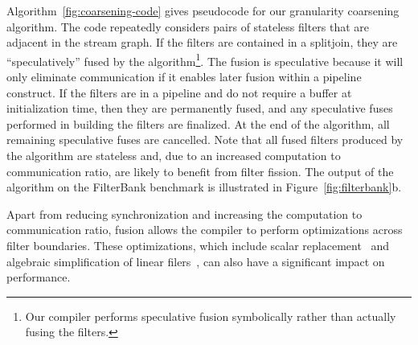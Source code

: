 Algorithm~\ref{fig:coarsening-code} gives pseudocode for our
granularity coarsening algorithm.  The code repeatedly considers pairs
of stateless filters that are adjacent in the stream graph.  If the
filters are contained in a splitjoin, they are ``speculatively'' fused
by the algorithm\footnote{Our compiler performs speculative fusion
symbolically rather than actually fusing the filters.}.  The fusion is
speculative because it will only eliminate communication if it enables
later fusion within a pipeline construct.  If the filters are in a
pipeline and do not require a buffer at initialization time, then they
are permanently fused, and any speculative fuses performed in building
the filters are finalized.  At the end of the algorithm, all remaining
speculative fuses are cancelled.  Note that all fused filters produced
by the algorithm are stateless and, due to an increased computation to
communication ratio, are likely to benefit from filter fission.  The
output of the algorithm on the FilterBank benchmark is illustrated in
Figure~\ref{fig:filterbank}b.

Apart from reducing synchronization and increasing the computation to
communication ratio, fusion allows the compiler to perform
optimizations across filter boundaries.  These optimizations, which
include scalar replacement~\cite{sermulins:lctes:2005} and algebraic
simplification of linear filers~\cite{lamb:pldi:2003,agrawal:cases:2005}, can
also have a significant impact on performance.
%

